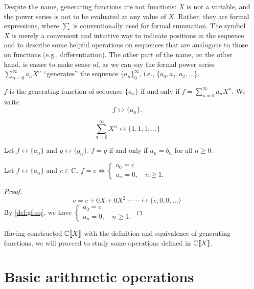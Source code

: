 \documentclass[a4paper, 12pt]{report}
\begin{document}
Despite the name, generating functions are not functions: $X$ is not a variable, and the power series is not to be evaluated at any value of $X$. Rather, they are formal expressions, where $\sum$ is conventionally used for formal summation. The symbol $X$ is merely a convenient and intuitive way to indicate positions in the sequence and to describe some helpful operations on sequences that are analogous to those on functions (e.g., differentiation). The other part of the name, on the other hand, is easier to make sense of, as we can say the formal power series $\sum_{n = 0}^{\infty} a_n X^n$ ``generates'' the sequence $\{a_n\}_0^\infty$, i.e., $\{a_0, a_1, a_2, \dots\}$.

\begin{defn}\label{def:gf-seq}
 $f$ is the generating function of sequence $\{a_n\}$ if and only if $f = \sum_{n = 0}^{\infty} a_n X^n$. We write 
 \[f \longleftrightarrow \{a_n\}.\]
\end{defn}
\begin{ex*}\label{ex:gf-111}
$$\sum_{n = 0}^\infty X^n \longleftrightarrow \{1, 1, 1, \dots\}$$
\end{ex*}

\begin{defn}\label{def:gf-eq}
Let $f \longleftrightarrow \{a_n\}$ and $g \longleftrightarrow \{g_n\}$. $f = g$ if and only if $a_n = b_n$ for all $n \geq 0$.
\end{defn}

\begin{lem}\label{lem:gf-id-c}
Let $f \longleftrightarrow \{a_n\}$ and $c \in \mathbb{C}$. $f = c \iff \begin{cases}
    a_0 = c\\
    a_n = 0, \quad n \geq 1.
\end{cases}$
\end{lem}
\begin{proof}\label{proof:gf-id-c}
\[c = c + 0X + 0X^2 + \cdots \longleftrightarrow \{c, 0, 0, \dots\}\]
By \cref{def:gf-eq}, we have $\begin{cases}
a_0 = c\\
a_n = 0, \quad n \geq 1.
\end{cases}$
\end{proof}

Having constructed $\mathbb{C}\llbracket X \rrbracket$ with the definition and equivalence of generating functions, we will proceed to study some operations defined in $\mathbb{C}\llbracket X \rrbracket$.

\section{Basic arithmetic operations}
\end{document}

